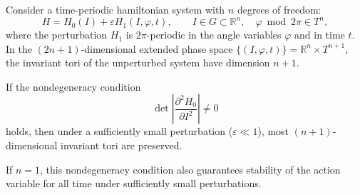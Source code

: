 Consider a time-periodic hamiltonian system with $n$ degrees of freedom:
$$H = H_0(I) + \varepsilon H_1(I, \varphi, t), \qquad I \in G \subset \mathbb{R}^n, \quad \varphi \bmod 2\pi \in T^n,$$
where the perturbation $H_1$ is $2\pi$-periodic in the angle variables $\varphi$ and in time $t$. In the $(2n+1)$-dimensional extended phase space $\{(I, \varphi, t)\} = \mathbb{R}^n \times T^{n+1}$, the invariant tori of the unperturbed system have dimension $n+1$.

If the nondegeneracy condition
$$\det \left| \frac{\partial^2 H_0}{\partial I^2} \right| \neq 0$$
holds, then under a sufficiently small perturbation ($\varepsilon \ll 1$), most $(n+1)$-dimensional invariant tori are preserved.

If $n = 1$, this nondegeneracy condition also guarantees stability of the action variable for all time under sufficiently small perturbations.
